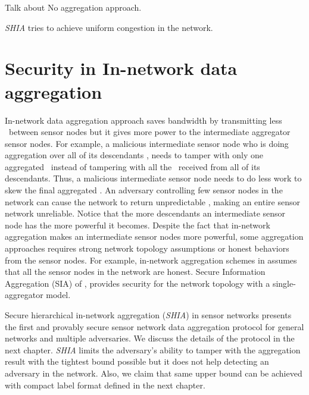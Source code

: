 	Talk about No aggregation approach.

	\textit{SHIA} tries to achieve uniform congestion in the network.	

\section{Security in In-network data aggregation}
	In-network data aggregation approach saves bandwidth by transmitting less \payloads\  between sensor nodes but it gives more power to the intermediate aggregator sensor nodes. 
	For example, a malicious intermediate sensor node who is doing aggregation over all of its descendants \payloads, needs to tamper with only one aggregated \payload\ instead of tampering with all the \payloads\ received from all of its descendants. 
	Thus, a malicious intermediate sensor node needs to do less work to skew the final aggregated \payload.
	An adversary controlling few sensor nodes in the network can cause the network to return unpredictable \payloads, making an entire sensor network unreliable.
	Notice that the more descendants an intermediate sensor node has the more powerful it becomes.
	Despite the fact that in-network aggregation makes an intermediate sensor nodes more powerful, some aggregation approaches requires strong network topology assumptions or honest behaviors from the sensor nodes.
	For example, in-network aggregation schemes in \cite{yao2002cougar, madden2003design} assumes that all the sensor nodes in the network are honest. Secure Information Aggregation (SIA) of \cite{przydatek2003sia}, provides security for the network topology with a single-aggregator model.  

	Secure hierarchical in-network aggregation (\textit{SHIA}) in sensor networks \cite{chan2006secure} presents the first and provably secure sensor network data aggregation protocol for general networks and multiple adversaries. 
	We discuss the details of the protocol in the next chapter. 
	\textit{SHIA} limits the adversary's ability to tamper with the aggregation result with the tightest bound possible but it does not help detecting an adversary in the network.
	Also, we claim that same upper bound can be achieved with compact label format defined in the next chapter.